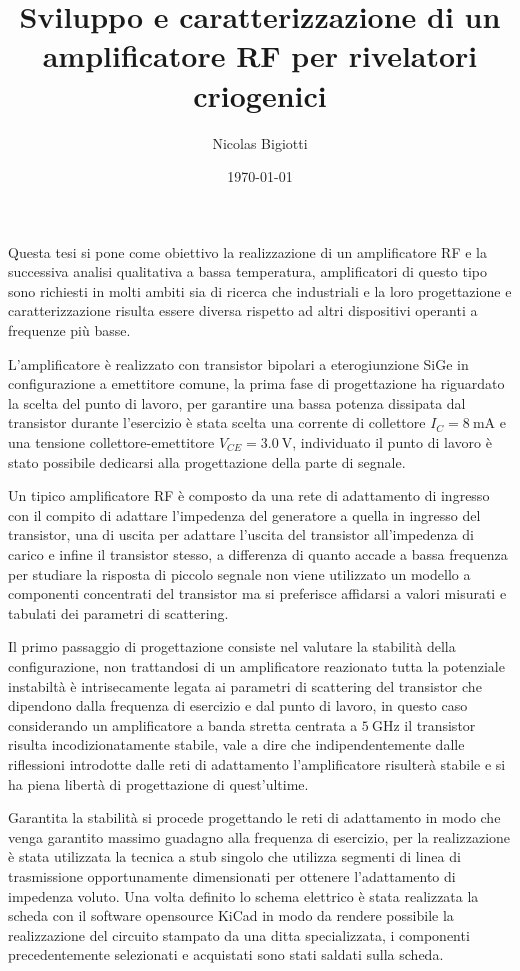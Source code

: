 \documentclass[12pt]{article}
\title{Sviluppo e caratterizzazione di un amplificatore RF per rivelatori criogenici}
\author{Nicolas Bigiotti}
\date{\today}
\begin{document}
\maketitle

Questa tesi si pone come obiettivo la realizzazione di un amplificatore RF e la successiva analisi qualitativa a bassa temperatura, amplificatori di questo tipo sono richiesti in molti ambiti sia di ricerca che industriali e la loro progettazione e caratterizzazione risulta essere diversa rispetto ad altri dispositivi operanti a frequenze più basse.

L'amplificatore è realizzato con transistor bipolari a eterogiunzione SiGe in configurazione a emettitore comune, la prima fase di progettazione ha riguardato la scelta del punto di lavoro, per garantire una bassa potenza dissipata dal transistor durante l'esercizio è stata scelta una corrente di collettore $I_{C}=\SI{8}{\milli\ampere}$ e una tensione collettore-emettitore $V_{CE}=\SI{3.0}{\volt}$, individuato il punto di lavoro è stato possibile dedicarsi alla progettazione della parte di segnale.

Un tipico amplificatore RF è composto da una rete di adattamento di ingresso con il compito di adattare l'impedenza del generatore a quella in ingresso del transistor, una di uscita per adattare l'uscita del transistor all'impedenza di carico e infine il transistor stesso, a differenza di quanto accade a bassa frequenza per studiare la risposta di piccolo segnale non viene utilizzato un modello a componenti concentrati del transistor ma si preferisce affidarsi a valori misurati e tabulati dei parametri di scattering.

Il primo passaggio di progettazione consiste nel valutare la stabilità della configurazione, non trattandosi di un amplificatore reazionato tutta la potenziale instabiltà è intrisecamente legata ai parametri di scattering del transistor che dipendono dalla frequenza di esercizio e dal punto di lavoro, in questo caso considerando un amplificatore a banda stretta centrata a $\SI{5}{\giga\hertz}$ il transistor risulta incodizionatamente stabile, vale a dire che indipendentemente dalle riflessioni introdotte dalle reti di adattamento l'amplificatore risulterà stabile e si ha piena libertà di progettazione di quest'ultime.

Garantita la stabilità si procede progettando le reti di adattamento in modo che venga garantito massimo guadagno alla frequenza di esercizio, per la realizzazione è stata utilizzata la tecnica a stub singolo che utilizza segmenti di linea di trasmissione opportunamente dimensionati per ottenere l'adattamento di impedenza voluto.
Una volta definito lo schema elettrico è stata realizzata la scheda con il software opensource KiCad in modo da rendere possibile la realizzazione del circuito stampato da una ditta specializzata, i componenti precedentemente selezionati e acquistati sono stati saldati sulla scheda.
\end{document}

